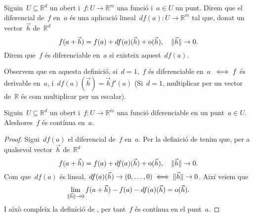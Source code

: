 \documentclass[../../main.tex]{subfiles}
\begin{document}
    \begin{definition}
        \label{def:diferencial}
        Siguin~\(U\subseteq\mathbb{R}^{d}\) un obert i~\(f\colon U\to\mathbb{R}^{m}\) una funció i~\(a\in U\) un punt.
        Direm que el diferencial de~\(f\) en~\(a\) és una aplicació lineal~\(df(a)\colon U\to\mathbb{R}^{m}\) tal que, donat un vector~\(\vec{h}\) de~\(\mathbb{R}^{d}\)
        \[
            f(a+\vec{h})=f(a)+df(a)(\vec{h})+\operatorname{o}(\vec{h}),\quad\lVert\vec{h}\rVert\to0.
        \]
        Direm que~\(f\) és diferenciable en~\(a\) si existeix aquest~\(df(a)\).
    \end{definition}
    \begin{observation}
        \label{obs:diferencial en d=1 és com derivar}
        Observem que en aquesta definició, si~\(d=1\),~\(f\) és diferenciable en~\(a\)~\(\iff f\) és derivable en~\(a\), i~\(df(a)(\vec{h})=\vec{h}f'(a)\) (Si~\(d=1\), multiplicar per un vector de~\(\mathbb{R}\) és com multiplicar per un escalar).
    \end{observation}
    \begin{proposition}
        \label{prop:Diferenciable implica contínua}
        Siguin~\(U\subseteq\mathbb{R}^{d}\) un obert i~\(f\colon U\to\mathbb{R}^{m}\) una funció diferenciable en un punt~\(a\in U\).
        Aleshores~\(f\) és contínua en~\(a\).
        \begin{proof}
            Sigui~\(df(a)\) el diferencial de~\(f\) en~\(a\).
            Per la definició de  tenim que, per a qualsevol vector~\(\vec{h}\) de~\(\mathbb{R}^d\)
            \[
                f(a+\vec{h})=f(a)+df(a)(\vec{h})+\operatorname{o}(\vec{h}),\quad \lVert\vec{h}\rVert\to0.
            \]
            Com que~\(df(a)\) és lineal,~\(df(a)(\vec{h})\to(0,\dots,0)\iff\lVert\vec{h}\rVert\to0\).
            Així veiem que
            \[
                \lim_{\lVert\vec{h}\rVert\to0}f(a+\vec{h})-f(a)-df(a)(\vec{h})=\operatorname{o}(\vec{h}).
            \]
            I això compleix la definició de , per tant~\(f\) és contínua en el punt~\(a\).
        \end{proof}
    \end{proposition}
\end{document}
